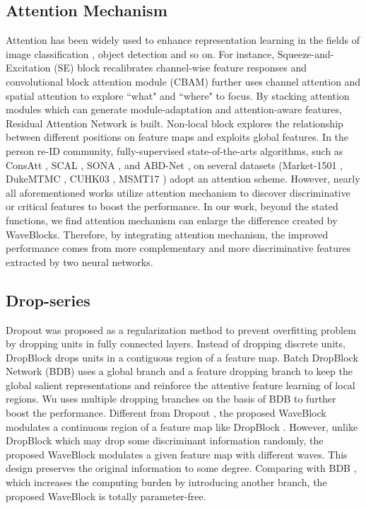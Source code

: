 \documentclass[journal]{IEEEtran}
\begin{document}
\subsection{Attention Mechanism}
Attention has been widely used to enhance representation learning in the fields of image classification \cite{wang2017residual,peng2017object,xiang2020semi}, object detection \cite{chen2018reverse,zhang2018progressive,fan2019shifting} and so on. For instance, Squeeze-and-Excitation (SE) block \cite{hu2018squeeze} recalibrates
channel-wise feature responses and convolutional block attention module (CBAM) \cite{woo2018cbam} further uses channel attention and spatial attention to explore ``what" and ``where" to focus. By stacking attention modules which can generate       module-adaptation and attention-aware features, Residual Attention Network \cite{wang2017residual} is built. Non-local block \cite{wang2018non} explores the relationship between different positions on feature maps and exploits global features. In the person re-ID community, fully-supervised state-of-the-arts algorithms, such as ConsAtt \cite{zhou2019discriminative}, SCAL \cite{chen2019self}, SONA \cite{xia2019second}, and ABD-Net \cite{chen2019abd}, on several datasets (Market-1501 \cite{zheng2015scalable}, DukeMTMC \cite{zheng2017unlabeled}, CUHK03 \cite{li2014deepreid}, MSMT17 \cite{wei2018person}) adopt an attention scheme. However, nearly all aforementioned works utilize attention mechanism to discover discriminative or critical features to boost the performance. In our work, beyond the stated functions, we find attention mechanism can enlarge the difference created by WaveBlocks. Therefore, by integrating attention mechanism, the improved performance comes from more complementary and more discriminative features extracted by two neural networks.





\subsection{Drop-series}
Dropout \cite{JMLR:v15:srivastava14a} was proposed as a regularization method to prevent overfitting problem by dropping units in fully connected layers. Instead of dropping discrete units, DropBlock \cite{ghiasi2018dropblock} drops units in a contiguous region of a feature map. Batch DropBlock Network (BDB) \cite{dai2019batch} uses a global branch and a feature dropping branch to keep the global salient representations and reinforce the attentive feature learning of local regions. Wu \cite{wu2020diversity} uses multiple dropping branches on the basis of BDB \cite{dai2019batch} to further boost the performance. Different from Dropout \cite{JMLR:v15:srivastava14a}, the proposed WaveBlock modulates a continuous region of a feature map like DropBlock \cite{ghiasi2018dropblock}. However, unlike DropBlock \cite{ghiasi2018dropblock} which may drop some discriminant information randomly, the proposed WaveBlock modulates a given feature map with different waves. This design preserves the original information to some degree. Comparing with BDB \cite{dai2019batch}, which increases the computing burden by introducing another branch, the proposed WaveBlock is totally parameter-free.
\end{document}

